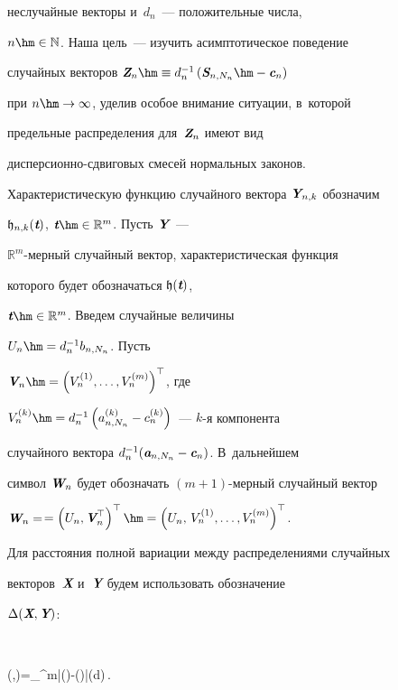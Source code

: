 неслучайные векторы и~$d_n$~--- положительные числа,


$n\hm\in\mathbb{N}$. Наша цель~--- изучить асимптотическое поведение


случайных векторов $\vZ_n\hm\equiv d_n^{-1}\left(\vS_{n,N_n}\hm-\vc_n\right)$


при $n\hm\to\infty$, уделив особое внимание ситуации, в~которой


предельные распределения для~$\emph{\textbf{Z}}_n$ имеют вид


дис\-пер\-си\-он\-но-сдви\-го\-вых смесей нормальных законов.





Характеристическую функцию случайного вектора $\emph{\textbf{Y}}_{n,k}$ обозначим


$\mathfrak{h}_{n,k}(\emph{\textbf{t}})$, $\vt\hm\in\mathbb{R}^m$. Пусть $\emph{\textbf{Y}}$~---


$\mathbb{R}^m$-мер\-ный случайный вектор, характеристическая функция


которого будет обозначаться $\mathfrak{h}(\emph{\textbf{t}})$,


$\vt\hm\in\mathbb{R}^m$. Введем случайные величины


$U_n\hm=d_n^{-1}b_{n,N_n}$. Пусть


$\vV_n\hm=\left(V_n^{(1)},\ldots,V_n^{(m)}\right)^{\top}$, где


$V_n^{(k)}\hm=d_n^{-1}\left(a_{n,N_n}^{(k)}-c_n^{(k)}\right)$~--- $k$-я компонента


случайного вектора $d_n^{-1}(\emph{\textbf{a}}_{n,N_n}-\emph{\textbf{c}}_n)$. В~дальнейшем


символ $\emph{\textbf{W}}_n$ будет обозначать $(m+1)$-мер\-ный случайный вектор


$\vW_n=$\linebreak $=\left(U_n,\vV_n^{\top}\right)^{\top}\hm=\left(


U_n,\,V_n^{(1)},\ldots,V_n^{(m)}\right)^{\top}$.










Для расстояния полной вариации между распределениями случайных


векторов~$\emph{\textbf{X}}$ и~$\emph{\textbf{Y}}$ будем использовать обозначение


$\Delta(\emph{\textbf{X}},\emph{\textbf{Y}})$:


$$


\Delta(\vX,\vY)=\int\limits_{^m}|(\vX)-(\vY)|(d\vx)\,.


